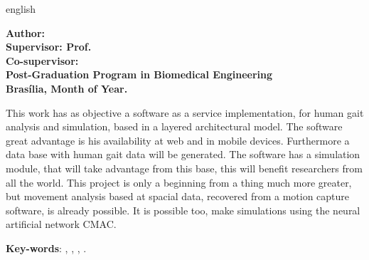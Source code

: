 \begin{resumo}[Abstract]
 \begin{otherlanguage*}{english}

 \begin{center}
\textbf{\imprimirTitle}
\end{center}

\begin{flushleft}
\footnotesize
\textbf{Author: \imprimirautor}\\
\textbf{Supervisor: Prof. \imprimirorientador} \\
\textbf{Co-supervisor: \imprimirmembroCoorientador} \\
\textbf{Post-Graduation Program in Biomedical Engineering} \\
\textbf{Brasília, Month of Year.}\newline
\end{flushleft}
 
This work has as objective a software as a service implementation, for human gait analysis and simulation, based in a layered architectural model. The software great advantage is his availability at web and in mobile devices. Furthermore a data base with human gait data will be generated. The software has a simulation module, that will take advantage from this base, this will benefit researchers from all the world. This project is only a beginning from a thing much more greater, but movement analysis based at spacial data, recovered from a motion capture software, is already possible. It is possible too, make simulations using the neural artificial network CMAC.


   \vspace{\onelineskip}
 
   \noindent 
   \textbf{Key-words}: 	\imprimirpalavrachaveumingles, \imprimirpalavrachavedoisingles, 
			\imprimirpalavrachavetresingles, \imprimirpalavrachavequatroingles.

 \end{otherlanguage*}
\end{resumo}
